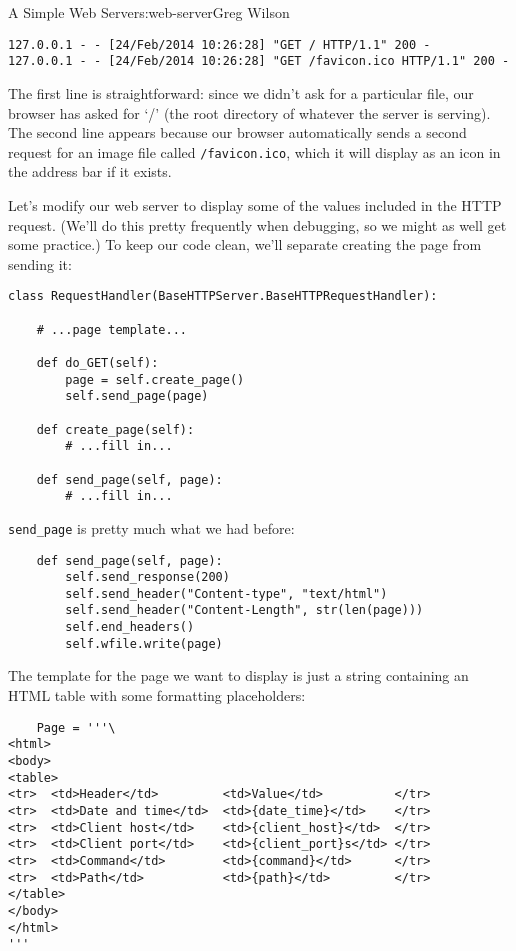 \begin{aosachapter}{A Simple Web Server}{s:web-server}{Greg Wilson}
\begin{verbatim}
127.0.0.1 - - [24/Feb/2014 10:26:28] "GET / HTTP/1.1" 200 -
127.0.0.1 - - [24/Feb/2014 10:26:28] "GET /favicon.ico HTTP/1.1" 200 -
\end{verbatim}

The first line is straightforward: since we didn't ask for a particular
file, our browser has asked for `/' (the root directory of whatever the
server is serving). The second line appears because our browser
automatically sends a second request for an image file called
\texttt{/favicon.ico}, which it will display as an icon in the address
bar if it exists.

\label{displaying-values}

Let's modify our web server to display some of the values included in
the HTTP request. (We'll do this pretty frequently when debugging, so we
might as well get some practice.) To keep our code clean, we'll separate
creating the page from sending it:

\begin{verbatim}
class RequestHandler(BaseHTTPServer.BaseHTTPRequestHandler):

    # ...page template...

    def do_GET(self):
        page = self.create_page()
        self.send_page(page)

    def create_page(self):
        # ...fill in...

    def send_page(self, page):
        # ...fill in...
\end{verbatim}

\texttt{send\_page} is pretty much what we had before:

\begin{verbatim}
    def send_page(self, page):
        self.send_response(200)
        self.send_header("Content-type", "text/html")
        self.send_header("Content-Length", str(len(page)))
        self.end_headers()
        self.wfile.write(page)
\end{verbatim}

The template for the page we want to display is just a string containing
an HTML table with some formatting placeholders:

\begin{verbatim}
    Page = '''\
<html>
<body>
<table>
<tr>  <td>Header</td>         <td>Value</td>          </tr>
<tr>  <td>Date and time</td>  <td>{date_time}</td>    </tr>
<tr>  <td>Client host</td>    <td>{client_host}</td>  </tr>
<tr>  <td>Client port</td>    <td>{client_port}s</td> </tr>
<tr>  <td>Command</td>        <td>{command}</td>      </tr>
<tr>  <td>Path</td>           <td>{path}</td>         </tr>
</table>
</body>
</html>
'''
\end{verbatim}


\end{aosachapter}
